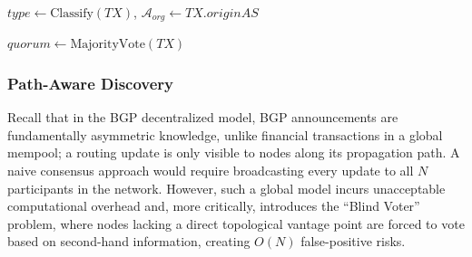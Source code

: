\documentclass[conference]{IEEEtran}
\newcommand{\md}[1]{{\color{purple}#1}}
\begin{document}
\begin{algorithm}[t]
{
\caption{Integrated Trust Scoring and Incentives}
\label{alg:integrated_scoring}

$\mathit{type} \gets \text{Classify}(TX)$, $\mathcal{A}_{\mathit{org}} \gets TX.\mathit{originAS}$\;



$\mathit{quorum} \gets \text{MajorityVote}(TX)$\;

\;
}
\end{algorithm}


\subsubsection{Path-Aware Discovery} 

\md{Recall that in the BGP decentralized model, BGP announcements are fundamentally asymmetric knowledge, unlike financial transactions in a global mempool; a routing update is only visible to nodes along its propagation path. A naive consensus approach would require broadcasting every update to all $N$ participants in the network. However, such a global model incurs unacceptable computational overhead and, more critically, introduces the ``Blind Voter'' problem, where nodes lacking a direct topological vantage point are forced to vote based on second-hand information, creating $O(N)$ false-positive risks.}
\end{document}
